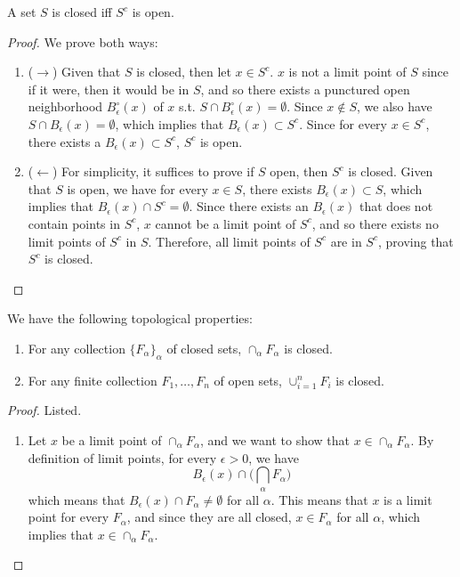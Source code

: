   \begin{theorem}
    A set $S$ is closed iff $S^c$ is open. 
  \end{theorem}
  \begin{proof}
    We prove both ways: 
    \begin{enumerate}
      \item ($\rightarrow$) Given that $S$ is closed, then let $x \in S^c$. $x$ is not a limit point of $S$ since if it were, then it would be in $S$, and so there exists a punctured open neighborhood $B_\epsilon^\circ (x)$ of $x$ s.t. $S \cap B_\epsilon^\circ (x) = \emptyset$. Since $x \not\in S$, we also have $S \cap B_\epsilon (x) = \emptyset$, which implies that $B_\epsilon (x) \subset S^c$. Since for every $x \in S^c$, there exists a $B_\epsilon (x) \subset S^c$, $S^c$ is open. 

      \item ($\leftarrow$) For simplicity, it suffices to prove if $S$ open, then $S^c$ is closed. Given that $S$ is open, we have for every $x \in S$, there exists $B_\epsilon (x) \subset S$, which implies that $B_\epsilon (x) \cap S^c = \emptyset$. Since there exists an $B_\epsilon (x)$ that does not contain points in $S^c$, $x$ cannot be a limit point of $S^c$, and so there exists no limit points of $S^c$ in $S$. Therefore, all limit points of $S^c$ are in $S^c$, proving that $S^c$ is closed.  
    \end{enumerate}
  \end{proof}

  \begin{theorem}
  We have the following topological properties: 
  \begin{enumerate}
      \item For any collection $\{F_\alpha\}_\alpha$ of closed sets, $\cap_\alpha F_\alpha$ is closed. 
      \item For any finite collection $F_1, \ldots, F_n$ of open sets, $\cup_{i=1}^n F_i$ is closed. 
  \end{enumerate}
  \end{theorem}
  \begin{proof}
  Listed. 
  \begin{enumerate}
      \item Let $x$ be a limit point of $\cap_\alpha F_\alpha$, and we want to show that $x \in \cap_\alpha F_\alpha$. By definition of limit points, for every $\epsilon > 0$, we have 
      \[B_\epsilon (x) \cap \bigg( \bigcap_\alpha F_\alpha \bigg) \]
      which means that $B_\epsilon (x) \cap F_\alpha \neq \emptyset$ for all $\alpha$. This means that $x$ is a limit point for every $F_\alpha$, and since they are all closed, $x \in F_\alpha$ for all $\alpha$, which implies that $x \in \cap_\alpha F_\alpha$. 
  \end{enumerate}
  \end{proof}

